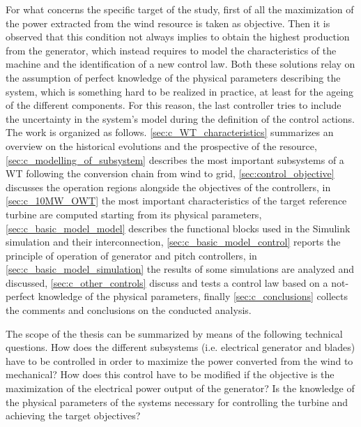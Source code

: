 For what concerns the specific target of the study, first of all the maximization of the power extracted from the wind resource is taken as objective. Then it is observed that this condition not always implies to obtain the highest production from the generator, which instead requires to model the characteristics of the machine and the identification of a new control law. Both these solutions relay on the assumption of perfect knowledge of the physical parameters describing the system, which is something hard to be realized in practice, at least for the ageing of the different components. For this reason, the last controller tries to include the uncertainty in the system's model during the definition of the control actions.  \\
The work is organized as follows. \autoref{sec:c_WT_characteristics} summarizes an overview on the historical evolutions and the prospective of the resource, \autoref{sec:c_modelling_of_subsystem} describes the most important subsystems of a WT following the conversion chain from wind to grid, \autoref{sec:control_objective} discusses the operation regions alongside the objectives of the controllers, in \autoref{sec:c_10MW_OWT} the most important characteristics of the target reference turbine are computed starting from its physical parameters, \autoref{sec:c_basic_model_model} describes the functional blocks used in the Simulink simulation and their interconnection, \autoref{sec:c_basic_model_control} reports the principle of operation of generator and pitch controllers, in \autoref{sec:c_basic_model_simulation} the results of some simulations are analyzed and discussed, \autoref{sec:c_other_controls} discuss and tests a control law based on a not-perfect knowledge of the physical parameters, finally \autoref{sec:c_conclusions} collects the comments and conclusions on the conducted analysis.

The scope of the thesis can be summarized by means of the following technical questions. How does the different subsystems (i.e. electrical generator and blades) have to be controlled in order to maximize the power converted from the wind to mechanical? How does this control have to be modified if the objective is the maximization of the electrical power output of the generator? Is the knowledge of the physical parameters of the systems necessary for controlling the turbine and achieving the target objectives? 

